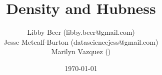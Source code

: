 \documentclass{beamer}
\title[Hubness]{Density and Hubness} %
\author[Density/Clustering]{Libby Beer (libby.beer@gmail.com)\\
Jesse Metcalf-Burton (datasciencejess@gmail.com)\\
Marilyn Vazquez ()} %
\date{\today} %
\begin{document}
\begin{frame}
\titlepage %
\end{frame}








\end{document}

